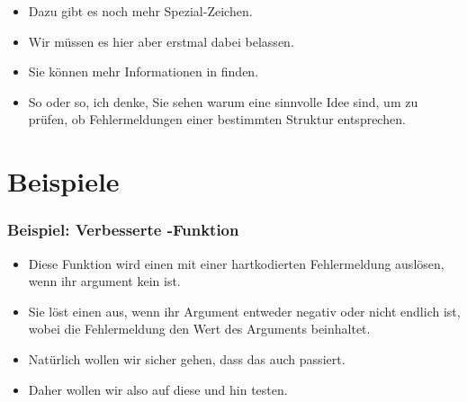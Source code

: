 \documentclass[aspectratio=169,mathserif,notheorems]{beamer}%
\begin{document}
\begin{frame}
\begin{itemize}
%
\item<16-> Dazu gibt es noch mehr Spezial-Zeichen.%
%
\item<17-> Wir müssen es hier aber erstmal dabei belassen.%
%
\item<18-> Sie können mehr Informationen in finden.%
%
\item<19-> So oder so, ich denke, Sie sehen warum  eine sinnvolle Idee sind, um zu prüfen, ob Fehlermeldungen einer bestimmten Struktur entsprechen.%
\end{itemize}%
\end{frame}%
%
\section{Beispiele}%
%
\begin{frame}[t]%
\frametitle{Beispiel: Verbesserte -Funktion}%
\parbox{0.4\paperwidth}{\small{%
\begin{itemize}%
%
%
%
%
%
%
%
\item<4-> Diese Funktion wird einen  mit einer hartkodierten Fehlermeldung auslösen, wenn ihr argument kein  ist.%
%
\item<5-> Sie löst einen  aus, wenn ihr Argument entweder negativ oder nicht endlich ist, wobei die Fehlermeldung den Wert des Arguments beinhaltet.%
%
\item<6-> Natürlich wollen wir sicher gehen, dass das auch passiert.%
%
\item<7-> Daher wollen wir also auf diese  und  hin testen.%
%
\end{itemize}%
}}%
%
%
%
%
%
\end{frame}%
\end{document}
